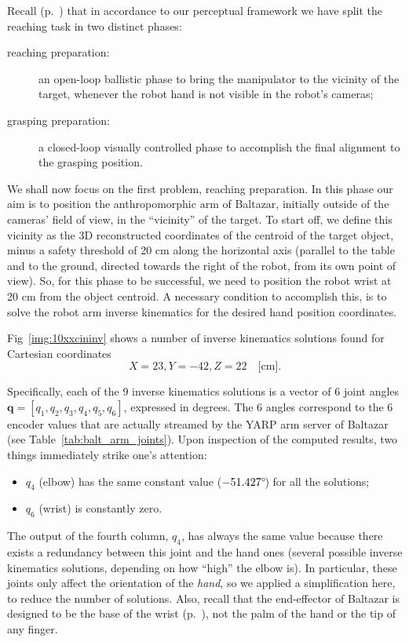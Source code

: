 Recall (p.~\pageref{intro:reaching_phases}) that in accordance to our perceptual framework we have split the reaching task in two distinct phases:
\begin{description}
\item[reaching preparation:] an open-loop ballistic phase to bring the manipulator to the vicinity of the target, whenever the robot hand is not visible in the robot's cameras;

\item[grasping preparation:] a closed-loop visually controlled phase to accomplish the final alignment to the grasping position.
\end{description}

We shall now focus on the first problem, reaching preparation. In this phase our aim is to position the anthropomorphic arm of Baltazar, initially outside of the cameras' field of view, in the ``vicinity'' of the target. To start off, we define this vicinity as the 3D reconstructed coordinates of the centroid of the target object, minus a safety threshold of 20 cm along the horizontal axis (parallel to the table and to the ground, directed towards the right of the robot, from its own point of view). So, for this phase to be successful, we need to position the robot wrist at 20 cm from the object centroid. A necessary condition to accomplish this, is to solve the robot arm inverse kinematics for the desired hand position coordinates.

Fig~\ref{img:10xxcininv} shows a number of inverse kinematics solutions found for Cartesian coordinates
\[
X = 23, Y = -42, Z = 22 \quad \textrm{[cm]}.
\]

Specifically, each of the 9 inverse kinematics solutions is a vector of 6 joint angles $\mathbf{q} = [q_1, q_2, q_3, q_4, q_5, q_6]$, expressed in degrees. The 6 angles correspond to the 6 encoder values that are actually streamed by the \ac{YARP} arm server of Baltazar (see Table~\ref{tab:balt_arm_joints}). Upon inspection of the computed results, two things immediately strike one's attention:
\begin{itemize}
\item $q_4$ (elbow) has the same constant value ($-51.427 ^\circ\!$) for all the solutions;

\item $q_6$ (wrist) is constantly zero.
\end{itemize}

The output of the fourth column, $q_4$, has always the same value because there exists a redundancy between this joint and the hand ones (several possible inverse kinematics solutions, depending on how ``high'' the elbow is). In particular, these joints only affect the orientation of the \emph{hand}, so we applied a simplification here, to reduce the number of solutions. Also, recall that the end-effector of Baltazar is designed to be the base of the wrist (p.~\pageref{balta_ee}), not the palm of the hand or the tip of any finger.

